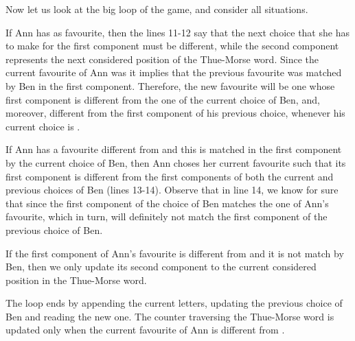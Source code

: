 \documentclass[runningheads,fleqn]{llncs}
\begin{document}
Now let us look at the big loop of the game, and consider all situations. 

If Ann has  as favourite, then the lines 11-12 say that the next choice that she has to make for the first component must be different, while the second component represents the next considered position of the Thue-Morse word. Since the current favourite of Ann was  it implies that the previous favourite was matched by Ben in the first component. Therefore, the new favourite will be one whose first component is different from the one of the current choice of Ben, and, moreover, different from the first component of his previous choice, whenever his current choice is .

If Ann has a favourite different from  and this is matched in the first component by the current choice of Ben, then Ann choses her current favourite such that its first component is different from the first components of both the current and previous choices of Ben (lines 13-14). Observe that in line 14, we know for sure that  since the first component of the choice of Ben matches the one of Ann's favourite, which in turn, will definitely not match the first component of the previous choice of Ben.

If the first component of Ann's favourite is different from  and it is not match by Ben, then we only update its second component to the current considered position in the Thue-Morse word.

The loop ends by appending the current letters, updating the previous choice of Ben and reading the new one. The counter traversing the Thue-Morse word is updated only when the current favourite of Ann is different from .
\end{document}
